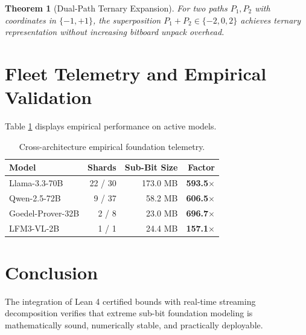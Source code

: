 \documentclass[10pt,twocolumn,letterpaper]{article}
\newtheorem{theorem}{Theorem}
\begin{document}
\begin{theorem}[Dual-Path Ternary Expansion]
For two paths $P_1, P_2$ with coordinates in $\{-1, +1\}$, the superposition $P_1 + P_2 \in \{-2, 0, 2\}$ achieves ternary representation without increasing bitboard unpack overhead.
\end{theorem}

\section{Fleet Telemetry and Empirical Validation}
Table \ref{tab:fleet} displays empirical performance on active models.

\begin{table}[h]
\centering
\small
\begin{tabular}{lrrr}
\toprule
\textbf{Model} & \textbf{Shards} & \textbf{Sub-Bit Size} & \textbf{Factor} \\
\midrule
Llama-3.3-70B & 22 / 30 & 173.0 MB & \textbf{593.5$\times$} \\
Qwen-2.5-72B & 9 / 37 & 58.2 MB & \textbf{606.5$\times$} \\
Goedel-Prover-32B & 2 / 8 & 23.0 MB & \textbf{696.7$\times$} \\
LFM3-VL-2B & 1 / 1 & 24.4 MB & \textbf{157.1$\times$} \\
\bottomrule
\end{tabular}
\caption{Cross-architecture empirical foundation telemetry.}
\label{tab:fleet}
\end{table}

\section{Conclusion}
The integration of Lean 4 certified bounds with real-time streaming decomposition verifies that extreme sub-bit foundation modeling is mathematically sound, numerically stable, and practically deployable.
\end{document}

